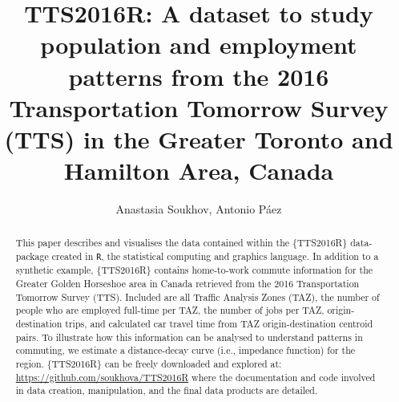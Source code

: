 \documentclass[Royal,times,sageh]{sagej}
\begin{document}

\title{TTS2016R: A dataset to study population and employment patterns
from the 2016 Transportation Tomorrow Survey (TTS) in the Greater
Toronto and Hamilton Area, Canada}

\runninghead{}

\author{Anastasia Soukhov\affilnum{}, Antonio Páez\affilnum{}}

\affiliation{\affilnum{}{}}



\begin{abstract}
This paper describes and visualises the data contained within the
\{TTS2016R\} data-package created in \texttt{R}, the statistical
computing and graphics language. In addition to a synthetic example,
\{TTS2016R\} contains home-to-work commute information for the Greater
Golden Horseshoe area in Canada retrieved from the 2016 Transportation
Tomorrow Survey (TTS). Included are all Traffic Analysis Zones (TAZ),
the number of people who are employed full-time per TAZ, the number of
jobs per TAZ, origin-destination trips, and calculated car travel time
from TAZ origin-destination centroid pairs. To illustrate how this
information can be analysed to understand patterns in commuting, we
estimate a distance-decay curve (i.e., impedance function) for the
region. \{TTS2016R\} can be freely downloaded and explored at:
\url{https://github.com/soukhova/TTS2016R} where the documentation and
code involved in data creation, manipulation, and the final data
products are detailed.
\end{abstract}


\maketitle





\end{document}
